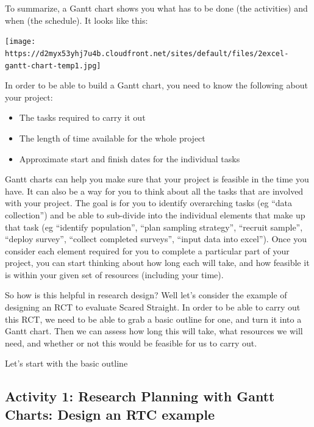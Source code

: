 \documentclass[]{book}
\providecommand{\tightlist}{%
  \setlength{\itemsep}{0pt}\setlength{\parskip}{0pt}}
\theoremstyle{definition}
\theoremstyle{definition}
\theoremstyle{definition}
\theoremstyle{remark}
\begin{document}
To summarize, a Gantt chart shows you what has to be done (the
activities) and when (the schedule). It looks like this:

\texttt{[image: https://d2myx53yhj7u4b.cloudfront.net/sites/default/files/2excel-gantt-chart-temp1.jpg]}

In order to be able to build a Gantt chart, you need to know the
following about your project:

\begin{itemize}
\tightlist
\item
  The tasks required to carry it out
\item
  The length of time available for the whole project
\item
  Approximate start and finish dates for the individual tasks
\end{itemize}

Gantt charts can help you make sure that your project is feasible in the
time you have. It can also be a way for you to think about all the tasks
that are involved with your project. The goal is for you to identify
overarching tasks (eg ``data collection'') and be able to sub-divide
into the individual elements that make up that task (eg ``identify
population'', ``plan sampling strategy'', ``recruit sample'', ``deploy
survey'', ``collect completed surveys'', ``input data into excel'').
Once you consider each element required for you to complete a particular
part of your project, you can start thinking about how long each will
take, and how feasible it is within your given set of resources
(including your time).

So how is this helpful in research design? Well let's consider the
example of designing an RCT to evaluate Scared Straight. In order to be
able to carry out this RCT, we need to be able to grab a basic outline
for one, and turn it into a Gantt chart. Then we can assess how long
this will take, what resources we will need, and whether or not this
would be feasible for us to carry out.

Let's start with the basic outline

\hypertarget{activity-1-research-planning-with-gantt-charts-design-an-rtc-example}{%
\subsection{Activity 1: Research Planning with Gantt Charts: Design an
RTC
example}\label{activity-1-research-planning-with-gantt-charts-design-an-rtc-example}}
\end{document}

